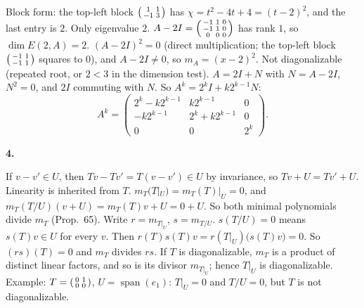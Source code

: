 \documentclass[10pt]{scrartcl}
\DeclareMathOperator{\spn}{span}
\begin{document}
\begin{enumerate}[a)]
  \ii Block form: the top-left block $\begin{psmallmatrix}1&1\\-1&3\end{psmallmatrix}$ has $\chi=t^2-4t+4=(t-2)^2$, and the last entry is $2$. Only eigenvalue $2$. $A-2I=\begin{psmallmatrix}-1&1&0\\-1&1&0\\0&0&0\end{psmallmatrix}$ has rank $1$, so $\dim E(2,A)=2$.
  \ii $(A-2I)^2=0$ (direct multiplication; the top-left block $\begin{psmallmatrix}-1&1\\-1&1\end{psmallmatrix}$ squares to $0$), and $A-2I\ne0$, so $m_A=(x-2)^2$. Not diagonalizable (repeated root, or $2<3$ in the dimension test).
  \ii $A=2I+N$ with $N=A-2I$, $N^2=0$, and $2I$ commuting with $N$. So $A^k=2^kI+k2^{k-1}N$:
  \[ A^k=\begin{pmatrix}2^k-k2^{k-1}&k2^{k-1}&0\\-k2^{k-1}&2^k+k2^{k-1}&0\\0&0&2^k\end{pmatrix}. \]
\end{enumerate}
\textbf{4.}
\begin{enumerate}[a)]
  \ii If $v-v'\in U$, then $Tv-Tv'=T(v-v')\in U$ by invariance, so $Tv+U=Tv'+U$. Linearity is inherited from $T$.
  \ii $m_T(T|_U)=m_T(T)|_U=0$, and $m_T(T/U)(v+U)=m_T(T)v+U=0+U$. So both minimal polynomials divide $m_T$ (Prop.~65).
  \ii Write $r=m_{T|_U}$, $s=m_{T/U}$. $s(T/U)=0$ means $s(T)v\in U$ for every $v$. Then $r(T)s(T)v=r(T|_U)\big(s(T)v\big)=0$. So $(rs)(T)=0$ and $m_T$ divides $rs$.
  \ii If $T$ is diagonalizable, $m_T$ is a product of distinct linear factors, and so is its divisor $m_{T|_U}$; hence $T|_U$ is diagonalizable. Example: $T=\begin{psmallmatrix}0&1\\0&0\end{psmallmatrix}$, $U=\spn(e_1)$: $T|_U=0$ and $T/U=0$, but $T$ is not diagonalizable.
\end{enumerate}
\end{document}
